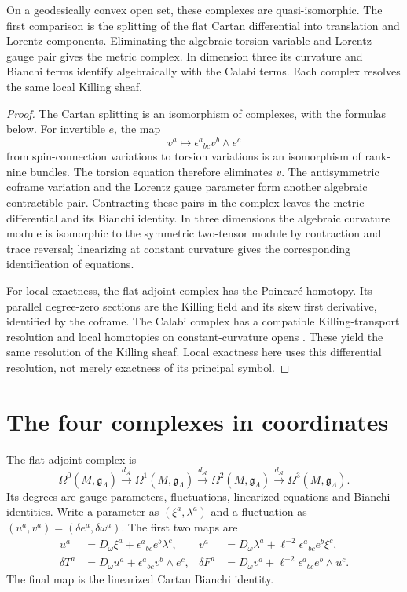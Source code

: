 \begin{theorem}
On a geodesically convex open set, these complexes are quasi-isomorphic.
The first comparison is the splitting of the flat Cartan differential into
translation and Lorentz components. Eliminating the algebraic torsion
variable and Lorentz gauge pair gives the metric complex. In dimension
three its curvature and Bianchi terms identify algebraically with the
Calabi terms. Each complex resolves the same local Killing sheaf.
\end{theorem}
\begin{proof}
The Cartan splitting is an isomorphism of complexes, with the formulas
below. For invertible $e$, the map
\[
 v^a\longmapsto\epsilon^a{}_{bc}v^b\wedge e^c
\]
from spin-connection variations to torsion variations is an isomorphism
of rank-nine bundles. The torsion equation therefore eliminates $v$.
The antisymmetric coframe variation and the Lorentz gauge parameter form
another algebraic contractible pair. Contracting these pairs in the
complex leaves the metric differential and its Bianchi identity.
In three dimensions the algebraic curvature module is isomorphic to the
symmetric two-tensor module by contraction and trace reversal; linearizing
at constant curvature gives the corresponding identification of equations.

For local exactness, the flat adjoint complex has the Poincar\'e homotopy.
Its parallel degree-zero sections are the Killing field and its skew first
derivative, identified by the coframe. The Calabi complex has a compatible
Killing-transport resolution and local homotopies on constant-curvature
opens \cite[Sec.~2 and Cor.~10]{KhavkineCalabi}. These yield the same
resolution of the Killing sheaf. Local exactness here uses this differential
resolution, not merely exactness of its principal symbol.
\end{proof}

\section{The four complexes in coordinates}
The flat adjoint complex is
\[
 \Omega^0(M,\mathfrak g_\Lambda)\xrightarrow{d_{\mathcal A}}
 \Omega^1(M,\mathfrak g_\Lambda)\xrightarrow{d_{\mathcal A}}
 \Omega^2(M,\mathfrak g_\Lambda)\xrightarrow{d_{\mathcal A}}
 \Omega^3(M,\mathfrak g_\Lambda).
\]
Its degrees are gauge parameters, fluctuations, linearized equations and
Bianchi identities. Write a parameter as $(\xi^a,\lambda^a)$ and a
fluctuation as $(u^a,v^a)=(\delta e^a,\delta\omega^a)$. The first two maps are
\[
\begin{aligned}
 u^a&=D_\omega\xi^a+\epsilon^a{}_{bc}e^b\lambda^c,&
 v^a&=D_\omega\lambda^a+\ell^{-2}\epsilon^a{}_{bc}e^b\xi^c,\\
 \delta T^a&=D_\omega u^a+\epsilon^a{}_{bc}v^b\wedge e^c,&
 \delta F^a&=D_\omega v^a+\ell^{-2}\epsilon^a{}_{bc}e^b\wedge u^c.
\end{aligned}
\]
The final map is the linearized Cartan Bianchi identity.


